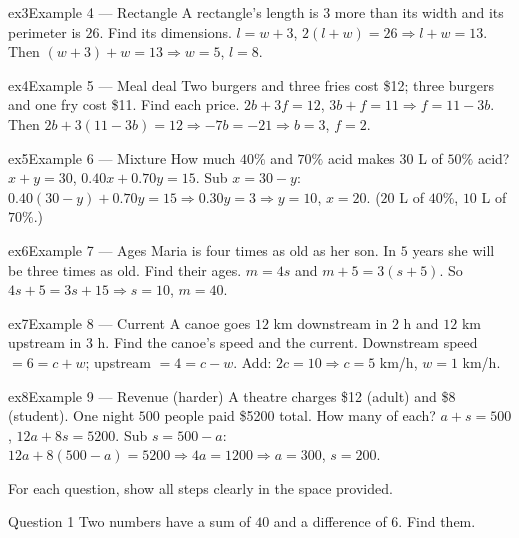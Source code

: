 \documentclass[11pt]{article}
\begin{document}
\begin{example}{ex3}{Example 4 --- Rectangle}
A rectangle's length is $3$ more than its width and its perimeter is $26$. Find its dimensions.
\soln $l=w+3$, $2(l+w)=26\Rightarrow l+w=13$. Then $(w+3)+w=13\Rightarrow w=5$, $l=8$.
\end{example}

\begin{example}{ex4}{Example 5 --- Meal deal}
Two burgers and three fries cost \$12; three burgers and one fry cost \$11. Find each price.
\soln $2b+3f=12$, $3b+f=11\Rightarrow f=11-3b$. Then $2b+3(11-3b)=12\Rightarrow -7b=-21\Rightarrow b=3$, $f=2$.
\end{example}

\begin{example}{ex5}{Example 6 --- Mixture}
How much $40\%$ and $70\%$ acid makes $30$ L of $50\%$ acid?
\soln $x+y=30$, $0.40x+0.70y=15$. Sub $x=30-y$: $0.40(30-y)+0.70y=15\Rightarrow 0.30y=3\Rightarrow y=10$, $x=20$. ($20$ L of $40\%$, $10$ L of $70\%$.)
\end{example}

\begin{example}{ex6}{Example 7 --- Ages}
Maria is four times as old as her son. In $5$ years she will be three times as old. Find their ages.
\soln $m=4s$ and $m+5=3(s+5)$. So $4s+5=3s+15\Rightarrow s=10$, $m=40$.
\end{example}

\begin{example}{ex7}{Example 8 --- Current}
A canoe goes $12$ km downstream in $2$ h and $12$ km upstream in $3$ h. Find the canoe's speed and the current.
\soln Downstream speed $=6=c+w$; upstream $=4=c-w$. Add: $2c=10\Rightarrow c=5$ km/h, $w=1$ km/h.
\end{example}

\begin{example}{ex8}{Example 9 --- Revenue (harder)}
A theatre charges \$12 (adult) and \$8 (student). One night $500$ people paid \$5200 total. How many of each?
\soln $a+s=500$, $12a+8s=5200$. Sub $s=500-a$: $12a+8(500-a)=5200\Rightarrow 4a=1200\Rightarrow a=300$, $s=200$.
\end{example}

\clearpage
{}
For each question, show all steps clearly in the space provided.

\begin{qbox}{Question 1}
Two numbers have a sum of $40$ and a difference of $6$. Find them.\workspace{2.6cm}
\end{qbox}
\end{document}
